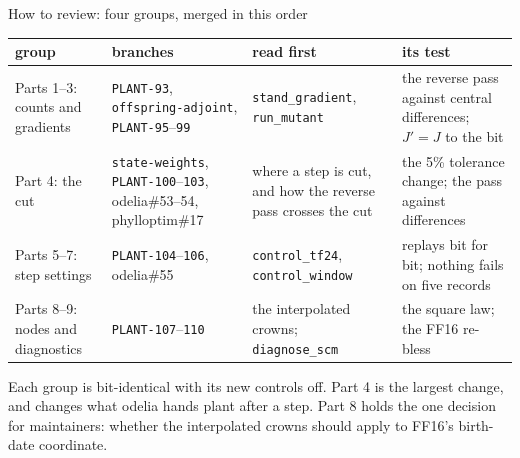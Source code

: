 \documentclass[aspectratio=169,10pt]{beamer}
\begin{document}
\begin{frame}{How to review: four groups, merged in this order}
  \footnotesize
  \begin{tabular}{@{}L{0.15\textwidth}L{0.27\textwidth}L{0.25\textwidth}L{0.24\textwidth}@{}}
    \toprule
    group & branches & read first & its test \\
    \midrule
    Parts 1--3: counts and gradients & \texttt{PLANT-93}, \texttt{offspring-adjoint}, \texttt{PLANT-95}--\texttt{99}
      & \texttt{stand\_gradient}, \texttt{run\_mutant}
      & the reverse pass against central differences; $J'=J$ to the bit \\
    Part 4: the cut & \texttt{state-weights}, \texttt{PLANT-100}--\texttt{103}, odelia\#53--54, phylloptim\#17
      & where a step is cut, and how the reverse pass crosses the cut
      & the 5\% tolerance change; the pass against differences \\
    Parts 5--7: step settings & \texttt{PLANT-104}--\texttt{106}, odelia\#55
      & \texttt{control\_tf24}, \texttt{control\_window}
      & replays bit for bit; nothing fails on five records \\
    Parts 8--9: nodes and diagnostics & \texttt{PLANT-107}--\texttt{110}
      & the interpolated crowns; \texttt{diagnose\_scm}
      & the square law; the FF16 re-bless \\
    \bottomrule
  \end{tabular}
  \medskip

  \small
  Each group is bit-identical with its new controls off. Part 4 is the largest change, and
  changes what odelia hands plant after a step. Part 8 holds the one decision for maintainers:
  whether the interpolated crowns should apply to FF16's birth-date coordinate.
\end{frame}
\end{document}
